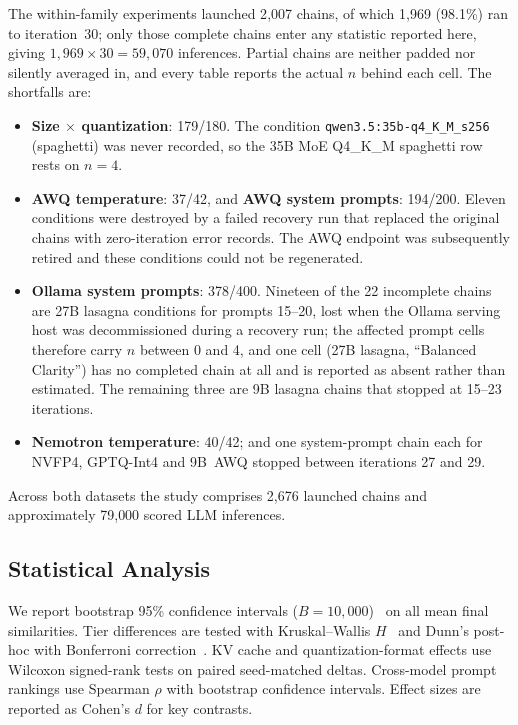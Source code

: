 \documentclass[11pt]{article}
\begin{document}
The within-family experiments launched 2{,}007 chains, of which 1{,}969
(98.1\%) ran to iteration~30; only those complete chains enter any statistic
reported here, giving $1{,}969 \times 30 = 59{,}070$ inferences. Partial chains
are neither padded nor silently averaged in, and every table reports the actual
$n$ behind each cell. The shortfalls are:
\begin{itemize}[leftmargin=*]
  \item \textbf{Size $\times$ quantization}: 179/180. The condition
        \texttt{qwen3.5:35b-q4\_K\_M\_s256} (spaghetti) was never recorded,
        so the 35B MoE Q4\_K\_M spaghetti row rests on $n=4$.
  \item \textbf{AWQ temperature}: 37/42, and \textbf{AWQ system prompts}:
        194/200. Eleven conditions were destroyed by a failed recovery run
        that replaced the original chains with zero-iteration error records.
        The AWQ endpoint was subsequently retired and these conditions could
        not be regenerated.
  \item \textbf{Ollama system prompts}: 378/400. Nineteen of the 22 incomplete
        chains are 27B lasagna conditions for prompts 15--20, lost when the
        Ollama serving host was decommissioned during a recovery run; the
        affected prompt cells therefore carry $n$ between 0 and 4, and one cell
        (27B lasagna, ``Balanced Clarity'') has no completed chain at all and
        is reported as absent rather than estimated. The remaining three are 9B
        lasagna chains that stopped at 15--23 iterations.
  \item \textbf{Nemotron temperature}: 40/42; and one system-prompt chain each
        for NVFP4, GPTQ-Int4 and 9B~AWQ stopped between iterations 27 and 29.
\end{itemize}

Across both datasets the study comprises 2{,}676 launched chains and
approximately 79{,}000 scored LLM inferences.

\subsection{Statistical Analysis}
\label{sec:stats}

We report bootstrap 95\% confidence intervals
($B=10{,}000$)~\citep{efron1993bootstrap} on all mean final similarities. Tier
differences are tested with Kruskal--Wallis $H$~\citep{kruskal1952ranks} and
Dunn's post-hoc with Bonferroni correction~\citep{dunn1964multiple}. KV cache
and quantization-format effects use Wilcoxon signed-rank tests on paired
seed-matched deltas. Cross-model prompt rankings use Spearman $\rho$ with
bootstrap confidence intervals. Effect sizes are reported as Cohen's $d$ for
key contrasts.
\end{document}
